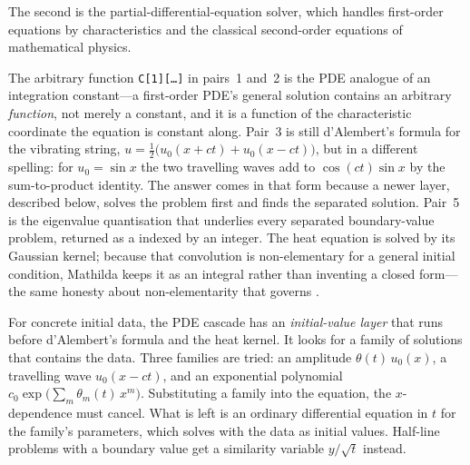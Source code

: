 \begin{codepairs}
\end{codepairs}

The second is the partial-differential-equation solver, which handles first-order
equations by characteristics and the classical second-order equations of
mathematical physics.

\begin{codepairs}
\end{codepairs}

The arbitrary function \texttt{C[1][\ldots]} in pairs~1 and~2 is the PDE analogue
of an integration constant---a first-order PDE's general solution contains an
arbitrary \emph{function}, not merely a constant, and it is a function of the
characteristic coordinate the equation is constant along. Pair~3 is still
d'Alembert's formula for the vibrating string,
\(u = \tfrac12\bigl(u_0(x+ct) + u_0(x-ct)\bigr)\), but in a different spelling: for
\(u_0 = \sin x\) the two travelling waves add to \(\cos(ct)\sin x\) by the
sum-to-product identity. The answer comes in that form because a newer layer, described
below, solves the problem first and finds the separated solution. Pair~5 is the
eigenvalue quantisation that underlies every separated boundary-value problem,
returned as a  indexed by an integer. The heat equation is
solved by its Gaussian kernel; because that convolution is non-elementary for a
general initial condition, Mathilda keeps it as an integral rather than inventing a
closed form---the same honesty about non-elementarity that governs .

For concrete initial data, the PDE cascade has an \emph{initial-value
layer} that runs before
d'Alembert's formula and the heat kernel. It looks for a family of solutions that
contains the data. Three families are tried: an amplitude \(\theta(t)\,u_0(x)\), a
travelling wave \(u_0(x-ct)\), and an exponential polynomial
\(c_0\exp\bigl(\sum_m \theta_m(t)\,x^m\bigr)\). Substituting a family into the
equation, the \(x\)-dependence must cancel. What is left is an ordinary differential
equation in \(t\) for the family's parameters, which  solves with the data as
initial values. Half-line problems with a boundary value get a similarity variable
\(y/\sqrt t\) instead.

